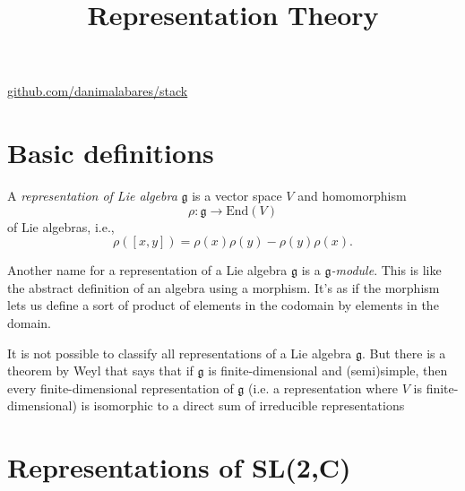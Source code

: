 



\title{Representation Theory}
\maketitle

\label{section-phantom}
\hfill
\href{http://github.com/danimalabares/stack}{github.com/danimalabares/stack}

\tableofcontents

\section{Basic definitions}
\label{section-basic-definitions}

\begin{definition}
\label{definition-representation}
A {\it representation of Lie algebra} $\mathfrak{g}$ is a vector space $V$ 
and homomorphism
$$
\rho:\mathfrak{g} \to \text{End}(V)
$$
of Lie algebras, i.e.,
$$
\rho([x,y])=\rho(x)\rho(y)-\rho(y)\rho(x).
$$
\end{definition}

\begin{remark}
\label{remark-representations-are-modules}
Another name for a representation of a Lie algebra $\mathfrak{g}$ is a 
{\it $\mathfrak{g}$-module}. This is like the abstract definition of an algebra
using a morphism. It's as if the morphism lets us define a sort of product of
elements in the codomain by elements in the domain.
\end{remark}

It is not possible to classify all representations of a Lie algebra
$\mathfrak{g}$. But there is a theorem by Weyl that says that if $\mathfrak{g}$
is finite-dimensional and (semi)simple, then every finite-dimensional
representation of $\mathfrak{g}$ 
(i.e. a representation where $V$ is finite-dimensional) 
is isomorphic to a direct sum of irreducible representations 


\section{Representations of SL(2,C)}
\label{section-sl2c}


